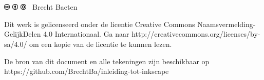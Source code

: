 \documentclass[t]{beamer}
\begin{document}
	\section*{}
	\begin{frame}
		\footnotesize
		\vspace{4cm}
		\includegraphics[height=0.3cm]{fig/cc} 
		\includegraphics[height=0.3cm]{fig/by} 
		\includegraphics[height=0.3cm]{fig/sa} 
		\quad \the\year\ Brecht Baeten
		\vspace{0.5cm}
		
    	Dit werk is gelicenseerd onder de licentie Creative Commons Naamsvermelding-GelijkDelen 4.0 Internationaal. Ga naar http://creativecommons.org/licenses/by-sa/4.0/ om een kopie van de licentie te kunnen lezen.
    	
    	\vspace{0.5cm}
    	De bron van dit document en alle tekeningen zijn beschikbaar op https://github.com/BrechtBa/inleiding-tot-inkscape
	\end{frame}	
	
\end{document}
